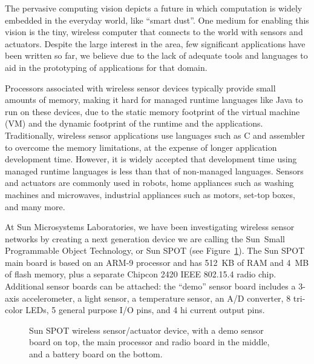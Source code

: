 \documentclass{sigplanconf}
\newcommand{\psfigbegin}[2]{\begin{figure}[htp] \centerline{\psfig{figure={#1},height={#2}}} }
\newcommand{\psfigend}[2]{{\small \bf \caption{\label{#1} {#2}}} \end{figure} }
\begin{document}
The pervasive computing vision depicts a future in which computation is
widely embedded in the everyday world, like ``smart dust''.  
One medium for enabling this vision is the tiny, wireless computer that 
connects to the world with sensors and actuators.
Despite the large interest in the area, few significant applications 
have been written so far, we believe due to the lack of adequate tools 
and languages to aid in the prototyping of applications for that domain. 

Processors associated with wireless sensor devices typically provide small 
amounts of memory, making it hard for managed runtime languages like Java 
to run on these devices, due to the static memory footprint of the virtual 
machine (VM) and the dynamic footprint of the runtime and the applications.
Traditionally, wireless sensor applications use languages such as C and assembler 
to overcome the memory limitations, at the expense of longer application
development time.  However, it is widely accepted that development time using 
managed runtime languages is less than that of non-managed languages.
Sensors and actuators are commonly used in robots, home appliances 
such as washing machines and microwaves, industrial appliances such as 
motors, set-top boxes, and many more. 

At Sun Microsystems Laboratories, we have been investigating wireless 
sensor networks by creating a next generation device we are calling the 
Sun\texttrademark\ Small Programmable Object Technology, or Sun SPOT (see 
Figure~\ref{fig-sunspot}). 
%
The Sun SPOT main board is based on an ARM-9 processor and has 
512~KB of RAM and 4~MB of flash memory, plus a separate Chipcon 2420 
IEEE 802.15.4 radio chip.  Additional sensor boards can be attached: the
``demo'' sensor board includes a 3-axis accelerometer, a light sensor, 
a temperature sensor, an A/D converter, 8 tri-color LEDs, 5 general 
purpose I/O pins, and 4 hi current output pins. 

\psfigbegin{SunSPOT.eps}{4cm}
\psfigend{fig-sunspot}{Sun SPOT wireless sensor/actuator device, with a demo 
	sensor board on top, the main processor and radio board in the middle, 
	and a battery board on the bottom.}
\end{document}
